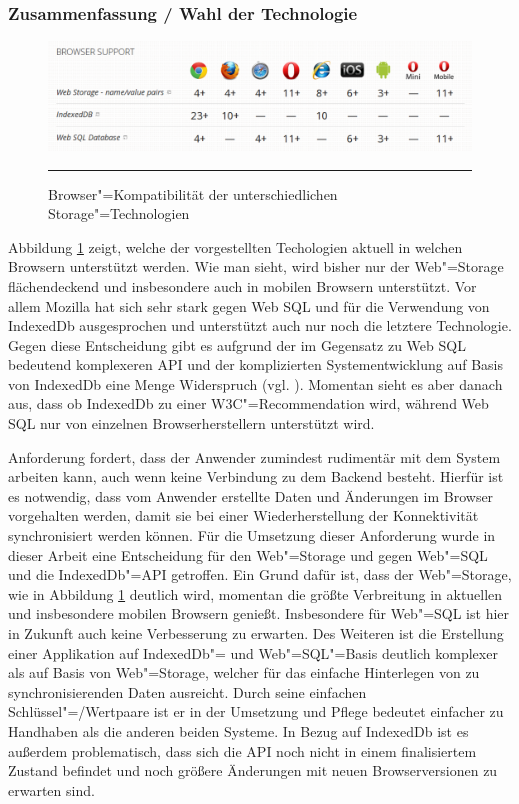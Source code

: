 \subsubsection*{Zusammenfassung / Wahl der Technologie}
\begin{figure}[ht]
  \centering
  \includegraphics[width=\textwidth,height=\textheight,keepaspectratio]{./Figures/storage_browser_compatibility.pdf}
    \rule{35em}{0.5pt}
  \caption[Storage Browser Kompatibilität]{Browser"=Kompatibilität der unterschiedlichen Storage"=Technologien}
  \label{fig:storage_browser_compatibility}
\end{figure}
Abbildung \ref{fig:storage_browser_compatibility} zeigt, welche der vorgestellten Techologien aktuell in welchen Browsern unterstützt werden. Wie man sieht, wird bisher nur der Web"=Storage flächendeckend und insbesondere auch in mobilen Browsern unterstützt. Vor allem Mozilla hat sich sehr stark gegen Web SQL und für die Verwendung von IndexedDb ausgesprochen und unterstützt auch nur noch die letztere Technologie. Gegen diese Entscheidung gibt es aufgrund der im Gegensatz zu Web SQL bedeutend komplexeren API und der komplizierten Systementwicklung auf Basis von IndexedDb eine Menge Widerspruch (vgl. \cite{Ranganathan2010}). Momentan sieht es aber danach aus, dass ob IndexedDb zu einer W3C"=Recommendation wird, während Web SQL nur von einzelnen Browserherstellern unterstützt wird.

Anforderung  fordert, dass der Anwender zumindest rudimentär mit dem System arbeiten kann, auch wenn keine Verbindung zu dem Backend besteht. Hierfür ist es notwendig, dass vom Anwender erstellte Daten und Änderungen im Browser vorgehalten werden, damit sie bei einer Wiederherstellung der Konnektivität synchronisiert werden können. Für die Umsetzung dieser Anforderung wurde in dieser Arbeit eine Entscheidung für den Web"=Storage und gegen Web"=SQL und die IndexedDb"=API getroffen. Ein Grund dafür ist, dass der Web"=Storage, wie in Abbildung \ref{fig:storage_browser_compatibility} deutlich wird, momentan die größte Verbreitung in aktuellen und insbesondere mobilen Browsern genießt. Insbesondere für Web"=SQL ist hier in Zukunft auch keine Verbesserung zu erwarten. Des Weiteren ist die Erstellung einer Applikation auf IndexedDb"= und Web"=SQL"=Basis deutlich komplexer als auf Basis von Web"=Storage, welcher für das einfache Hinterlegen von zu synchronisierenden Daten ausreicht. Durch seine einfachen Schlüssel"=/Wertpaare ist er in der Umsetzung und Pflege bedeutet einfacher zu Handhaben als die anderen beiden Systeme. In Bezug auf IndexedDb ist es außerdem problematisch, dass sich die API noch nicht in einem finalisiertem Zustand befindet und noch größere Änderungen mit neuen Browserversionen zu erwarten sind.

